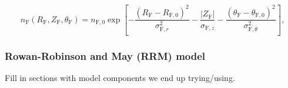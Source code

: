 \documentclass{aa}
\begin{document}
\begin{equation}\label{eq: feature}
   n_\mathrm{F}(R_\mathrm{F}, Z_\mathrm{F}, \theta_\mathrm{F}) = n_{\mathrm{F}, 0} \exp \left[-\frac{\left(R_\mathrm{F}-R_{\mathrm{F}, 0}\right)^{2}}{\sigma_{\mathrm{F}, r}^{2}}-\frac{\left|Z_\mathrm{F}\right|}{\sigma_{\mathrm{F}, z}}-\frac{\left(\theta_\mathrm{F}-\theta_{\mathrm{F}, 0}\right)^{2}}{\sigma_{\mathrm{F}, \theta }^{2}}\right],
\end{equation}

\subsubsection{Rowan-Robinson and May (RRM) model}
Fill in sections with model components we end up trying/using.



\end{document}
